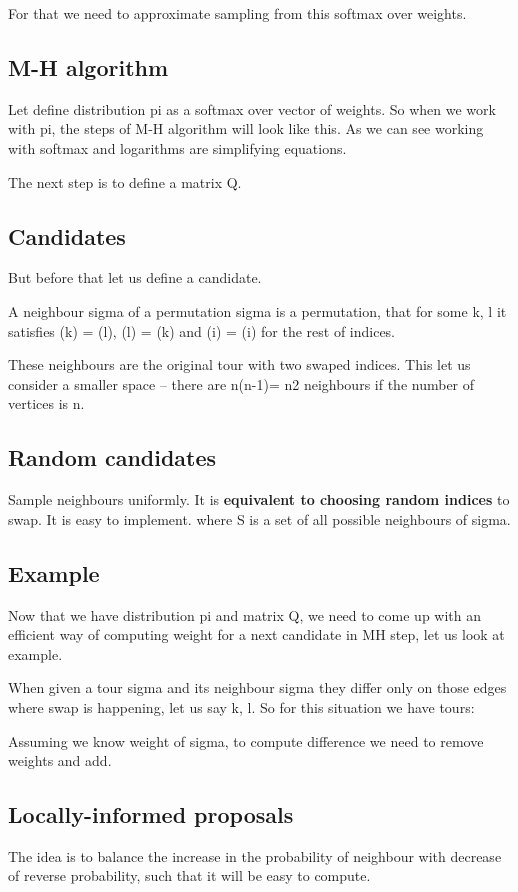 \documentclass{article}
\begin{document}
			For that we need to approximate sampling from this softmax over weights.
			
		\subsection{M-H algorithm}
			Let define distribution pi as a softmax over vector of weights. So when we work with pi, the steps of M-H algorithm will look like this. As we can see working with softmax and logarithms are simplifying equations.
			
			The next step is to define a matrix Q.
			
		\subsection{Candidates}
			But before that let us define a candidate.
			
			A neighbour sigma of a permutation sigma is a permutation, that for some k, l it satisfies (k) = (l), (l) = (k) and (i) = (i) for the rest of indices.
			
			These neighbours are the original tour with two swaped indices.
			This let us consider a smaller space -- there are n(n-1)= n2 neighbours if the number of vertices is n.
		
		\subsection{Random candidates}
			Sample neighbours uniformly. It is \textbf{equivalent to choosing random indices} to swap. It is easy to implement. where S is a set of all possible neighbours of sigma.
			
		\subsection{Example}
			Now that we have distribution pi and matrix Q, we need to come up with an efficient way of computing weight for a next candidate in MH step, let us look at example.
			
			When given a tour sigma and its neighbour sigma they differ only on those edges where swap is happening, let us say k, l. So for this situation we have tours:
			
			Assuming we know weight of sigma, to compute difference we need to remove weights and add.
			
		\subsection{Locally-informed proposals}
			The idea is to balance the increase in the probability of neighbour with decrease of reverse probability, such that it will be easy to compute.
			
\end{document}
